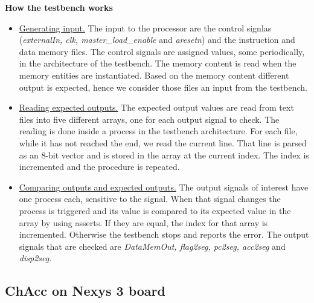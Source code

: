 \documentclass[a4paper,11pt]{article}
\begin{document}
\textbf{How the testbench works}
\begin{itemize}
  \item \underline{Generating input.} The input to the processor are the control signlas (\textit{externalIn, clk, master\_load\_enable} and \textit{aresetn}) and the instruction and data memory files. The control signals are assigned values, some periodically,  in the architecture of the testbench. The memory content is read when the memory entities are instantiated. Based on the memory content different output is expected, hence we consider those files an input from the testbench.
  \item \underline{Reading expected outputs.} The expected output values are read from text files into five different arrays, one for each output signal to check. The reading is done inside a process in the testbench architecture. For each file, while it has not reached the end, we read the current line. That line is parsed as an 8-bit vector and is stored in the array at the current index. The index is incremented and the procedure is repeated.
  \item \underline{Comparing outputs and expected outputs.} The output signals of interest have one process each, sensitive to the signal. When that signal changes the process is triggered and its value is compared to its expected value in the array by using asserts. If they are equal, the index for that array is incremented. Otherwise the testbench stops and reports the error. The output signals that are checked are \textit{DataMemOut, flag2seg, pc2seg, acc2seg} and \textit{disp2seg}.
\end{itemize}

\newpage
\subsection{ChAcc on Nexys 3 board}
\end{document}
